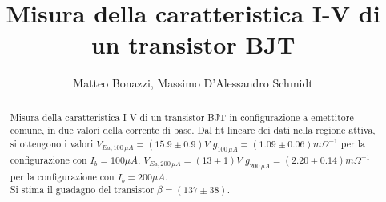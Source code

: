 \documentclass{article}
\title{Misura della caratteristica I-V di un transistor BJT}
\author{Matteo Bonazzi, Massimo D'Alessandro Schmidt}
\begin{document}
\maketitle
\begin{abstract}
    Misura della caratteristica I-V di un transistor BJT in configurazione a emettitore comune, in due valori della corrente di base.\newline
    Dal fit lineare dei dati nella regione attiva, si ottengono i valori $V_{Ea,100\,\mu A}=(15.9\pm 0.9) V$ $g_{100\,\mu A}=(1.09 \pm 0.06) m\Omega^{-1} $ per la configurazione con $I_b=100 \mu A$, $V_{Ea,200\,\mu A}=(13\pm 1) V $ $g_{200\,\mu A}=(2.20 \pm 0.14) m\Omega^{-1}$ per la configurazione con $I_b=200 \mu A$.\\
    Si stima il guadagno del transistor $\beta=(137\pm38)$.\\
\end{abstract}
\end{document}
